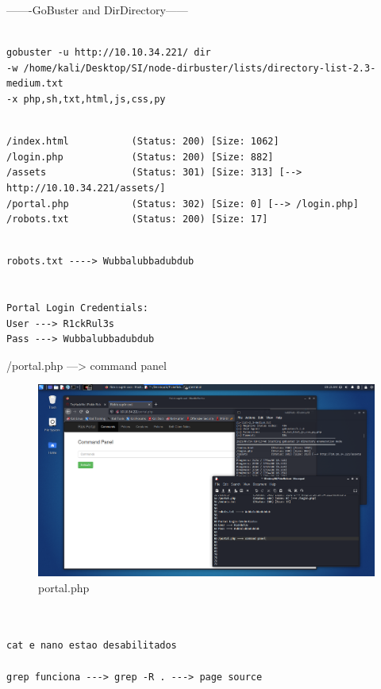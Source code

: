 \documentclass[11pt]{article}
\begin{document}
-------GoBuster and DirDirectory------
 \begin{verbatim}

gobuster -u http://10.10.34.221/ dir 
-w /home/kali/Desktop/SI/node-dirbuster/lists/directory-list-2.3-medium.txt 
-x php,sh,txt,html,js,css,py 
\end{verbatim}

\begin{lstlisting}

/index.html           (Status: 200) [Size: 1062]
/login.php            (Status: 200) [Size: 882] 
/assets               (Status: 301) [Size: 313] [--> http://10.10.34.221/assets/]
/portal.php           (Status: 302) [Size: 0] [--> /login.php]   
/robots.txt           (Status: 200) [Size: 17]  
\end{lstlisting}

 \begin{verbatim}

robots.txt ----> Wubbalubbadubdub


Portal Login Credentials:
User ---> R1ckRul3s
Pass ---> Wubbalubbadubdub
\end{verbatim}


/portal.php ---> command panel

\begin{figure}[h]
    \includegraphics[width=1\textwidth]{imgs/Screenshot_2021-07-14_09_23_22.png}
    \centering
    \caption{portal.php}
\end{figure}
 \begin{verbatim}


cat e nano estao desabilitados

grep funciona ---> grep -R . ---> page source
\end{verbatim}
\end{document}

